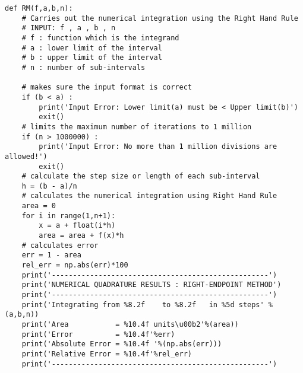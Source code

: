\documentclass[a4paper, 12pt]{report}
\begin{document}
\begin{lstlisting}
def RM(f,a,b,n):
    # Carries out the numerical integration using the Right Hand Rule
    # INPUT: f , a , b , n
    # f : function which is the integrand
    # a : lower limit of the interval
    # b : upper limit of the interval
    # n : number of sub-intervals

    # makes sure the input format is correct
    if (b < a) :
        print('Input Error: Lower limit(a) must be < Upper limit(b)')
        exit()
    # limits the maximum number of iterations to 1 million
    if (n > 1000000) :
        print('Input Error: No more than 1 million divisions are allowed!')
        exit()
    # calculate the step size or length of each sub-interval
    h = (b - a)/n
    # calculates the numerical integration using Right Hand Rule
    area = 0
    for i in range(1,n+1):
        x = a + float(i*h)
        area = area + f(x)*h
    # calculates error
    err = 1 - area
    rel_err = np.abs(err)*100
    print('---------------------------------------------------')
    print('NUMERICAL QUADRATURE RESULTS : RIGHT-ENDPOINT METHOD')
    print('---------------------------------------------------')
    print('Integrating from %8.2f    to %8.2f   in %5d steps' %(a,b,n))
    print('Area           = %10.4f units\u00b2'%(area))
    print('Error          = %10.4f'%err)
    print('Absolute Error = %10.4f '%(np.abs(err)))
    print('Relative Error = %10.4f'%rel_err)
    print('---------------------------------------------------')
\end{lstlisting}
\end{document}
